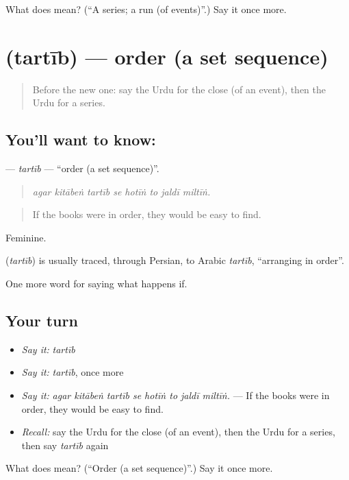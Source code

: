 \begin{tcolorbox}[breakable,colback=teal!4,colframe=teal!35!black,title={Before you move on}]
What does  mean? (\textquotedblleft{}A series; a run (of events)\textquotedblright{}.) Say it once more.
\end{tcolorbox}
\section[\texorpdfstring{\ur{ترتیب} (tartīb)}{ترتیب (tartīb)}]{ (tartīb) — order (a set sequence)}

\label{lesson:UR-C544-tartib}



\begin{quote}
Before the new one: say the Urdu for the close (of an event), then the Urdu for a series.
\end{quote}

\subsection*{You'll want to know: }
\textbf{} — \emph{tartīb} — \textquotedblleft{}order (a set sequence)\textquotedblright{}.

\begin{quote}
       
\end{quote}

\begin{quote}
\emph{agar kitābeṅ tartīb se hotīṅ to jaldī miltīṅ.}
\end{quote}

\begin{quote}
If the books were in order, they would be easy to find.
\end{quote}

Feminine.

\begin{cousinweb}
\textbf{} (\emph{tartīb}) is usually traced, through Persian, to Arabic \emph{tartīb}, \textquotedblleft{}arranging in order\textquotedblright{}.
\end{cousinweb}

\begin{grammarlens}[title={What you've built}]
One more word for saying what happens if.
\end{grammarlens}

\subsection*{Your turn}
\begin{itemize}
\raggedright
  \item \emph{Say it:} \emph{tartīb}
  \item \emph{Say it:} \emph{tartīb}, once more
  \item \emph{Say it:} \emph{agar kitābeṅ tartīb se hotīṅ to jaldī miltīṅ.} — If the books were in order, they would be easy to find.
  \item \emph{Recall:} say the Urdu for the close (of an event), then the Urdu for a series, then say \emph{tartīb} again
\end{itemize}

\begin{tcolorbox}[breakable,colback=teal!4,colframe=teal!35!black,title={Before you move on}]
What does  mean? (\textquotedblleft{}Order (a set sequence)\textquotedblright{}.) Say it once more.
\end{tcolorbox}
